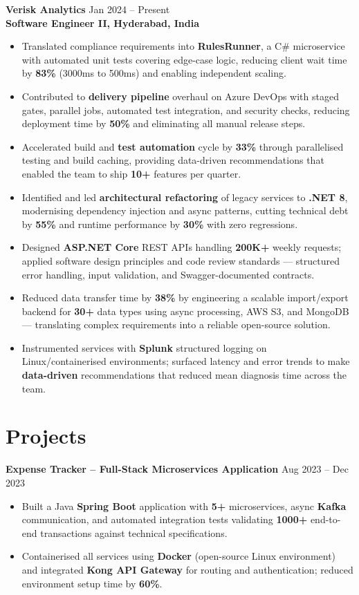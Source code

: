 \documentclass[letterpaper,10pt]{article}
\begin{document}
\textbf{Verisk Analytics} \hfill Jan 2024 -- Present \\
\textbf{Software Engineer II, Hyderabad, India}
\begin{itemize}[leftmargin=*]
    \item Translated compliance requirements into \textbf{RulesRunner}, a C\# microservice with automated unit tests covering edge-case logic, reducing client wait time by \textbf{83\%} (3000ms to 500ms) and enabling independent scaling.
    \item Contributed to \textbf{delivery pipeline} overhaul on Azure DevOps with staged gates, parallel jobs, automated test integration, and security checks, reducing deployment time by \textbf{50\%} and eliminating all manual release steps.
    \item Accelerated build and \textbf{test automation} cycle by \textbf{33\%} through parallelised testing and build caching, providing data-driven recommendations that enabled the team to ship \textbf{10+} features per quarter.
    \item Identified and led \textbf{architectural refactoring} of legacy services to \textbf{.NET 8}, modernising dependency injection and async patterns, cutting technical debt by \textbf{55\%} and runtime performance by \textbf{30\%} with zero regressions.
    \item Designed \textbf{ASP.NET Core} REST APIs handling \textbf{200K+} weekly requests; applied software design principles and code review standards — structured error handling, input validation, and Swagger-documented contracts.
    \item Reduced data transfer time by \textbf{38\%} by engineering a scalable import/export backend for \textbf{30+} data types using async processing, AWS S3, and MongoDB — translating complex requirements into a reliable open-source solution.
    \item Instrumented services with \textbf{Splunk} structured logging on Linux/containerised environments; surfaced latency and error trends to make \textbf{data-driven} recommendations that reduced mean diagnosis time across the team.
\end{itemize}

\section*{Projects}

\textbf{Expense Tracker -- Full-Stack Microservices Application} \hfill Aug 2023 -- Dec 2023
\begin{itemize}[leftmargin=*]
    \item Built a Java \textbf{Spring Boot} application with \textbf{5+} microservices, async \textbf{Kafka} communication, and automated integration tests validating \textbf{1000+} end-to-end transactions against technical specifications.
    \item Containerised all services using \textbf{Docker} (open-source Linux environment) and integrated \textbf{Kong API Gateway} for routing and authentication; reduced environment setup time by \textbf{60\%}.
\end{itemize}
\end{document}
